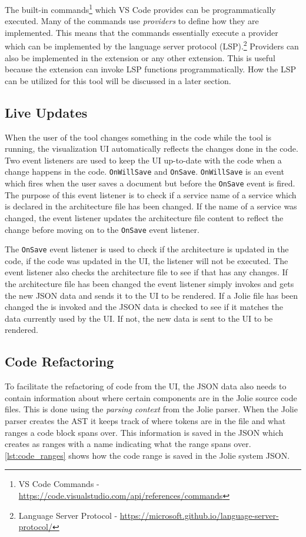 The built-in commands\footnote{VS Code Commands - \url{https://code.visualstudio.com/api/references/commands}} which VS Code provides can be programmatically executed.
Many of the commands use \textit{providers} to define how they are implemented. This means that the commands essentially execute a provider which can be implemented by the language server protocol (LSP).\footnote{Language Server Protocol - \url{https://microsoft.github.io/language-server-protocol/}}
Providers can also be implemented in the extension or any other extension.
This is useful because the extension can invoke LSP functions programmatically. How the LSP can be utilized for this tool will be discussed in a later section.

\subsection{Live Updates}
When the user of the tool changes something in the code while the tool is running, the visualization UI automatically reflects the changes done in the code.
Two event listeners are used to keep the UI up-to-date with the code when a change happens in the code. \texttt{OnWillSave} and \texttt{OnSave}.
\texttt{OnWillSave} is an event which fires when the user saves a document but before the \texttt{OnSave} event is fired. The purpose of this event listener is
to check if a service name of a service which is declared in the architecture file has been changed. If the name of a service was changed, the event listener updates the architecture file content to reflect the change before moving on to the \texttt{OnSave} event listener.

The \texttt{OnSave} event listener is used to check if the architecture is updated in the code, if the code was updated in the UI, the listener will not be executed. The event listener also checks the architecture file to see if that has any changes.
If the architecture file has been changed the event listener simply invokes \nodetoolname[] and gets the new JSON data and sends it to the UI to be rendered.
If a Jolie file has been changed the \nodetoolname[] is invoked and the JSON data is checked to see if it matches the data currently used by the UI. If not, the new data is sent to the UI to be rendered.

\subsection{Code Refactoring}
To facilitate the refactoring of code from the UI, the JSON data also needs to contain information about where certain components are in the Jolie source code files.
This is done using the \textit{parsing context} from the Jolie parser. When the Jolie parser creates the AST it keeps track of where tokens are in the file and what ranges a code block spans over.
This information is saved in the JSON which \javatoolname[] creates as ranges with a name indicating what the range spans over.
\cref{lst:code_ranges} shows how the code range is saved in the Jolie system JSON.

